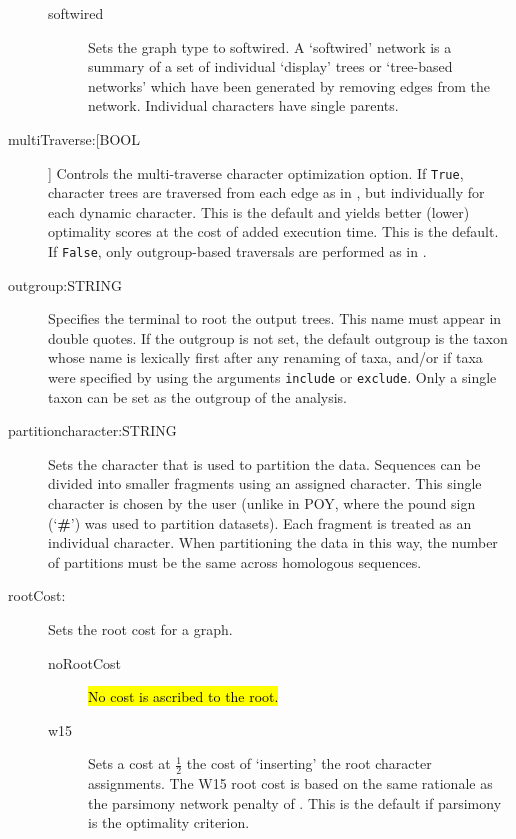 \begin{description}
\begin{description}
			\item[softwired]  Sets the graph type to softwired. A `softwired' network is 
			a summary of a set of individual `display' trees or `tree-based networks' 
			which have been generated by removing edges from the network. Individual 
			characters have single parents.				
			\end{description}
		
			
		\item[multiTraverse:[BOOL]] Controls the multi-traverse character optimization 
		option. If \texttt{True}, character trees are traversed from each edge as in 
		\citep{VaronandWheeler2012,VaronandWheeler2013, POY4, POY5}, but 
		individually for each dynamic character. This is the default and yields better 
		(lower) optimality scores at the cost of added execution time. This is the default.
		If \texttt{False}, only outgroup-based traversals are performed as in 
		\citep{Wheeler1996, POY2, POY3}. 
					
		\item[outgroup:STRING] Specifies the terminal to root the output trees. 
		This name must appear in double quotes. If the outgroup is not set, the 
		default outgroup is the taxon whose name is lexically first after any renaming 
		of taxa, and/or if taxa were specified by using the arguments \texttt{include} 
		or \texttt{exclude}. Only a single taxon can be set as the outgroup of the analysis. 
					
		\item[partitioncharacter:STRING] Sets the character that is used to partition the 
		data. Sequences can be divided into smaller fragments using an assigned character. 
		This single character is chosen by the user (unlike in POY, where the pound sign 
		(`\textbf{\#}') was used to partition datasets). Each fragment is treated as an individual 
		character. When partitioning the data in this way, the number of partitions must be the 
		same across homologous sequences.
			
		\item[rootCost:] Sets the root cost for a graph. 			
			\begin{description}
			\item[noRootCost]  \hl{No cost is ascribed to the root.}
			
			\item[w15]  Sets a cost at $\frac{1}{2}$ the cost of `inserting' the root character 
			assignments. The W15 root cost is based on the same rationale as the parsimony 
			network penalty of  \cite{Wheeler2015}. This is the default if parsimony is the 
			optimality criterion.


\end{description}
\end{description}
